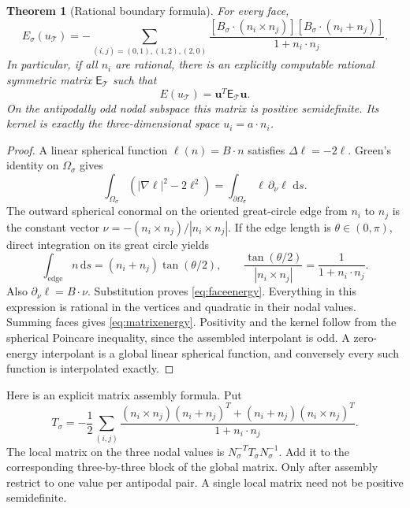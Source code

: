 \documentclass[11pt]{article}
\newtheorem{theorem}{Theorem}[section]
\theoremstyle{remark}\newtheorem{remark}[theorem]{Remark}
\newcommand{\dd}{\,\mathrm d}
\numberwithin{equation}{section}
\begin{document}
\begin{theorem}[Rational boundary formula]\label{thm:rationalmatrix}
For every face,
\begin{equation}\label{eq:faceenergy}
 \boxed{E_\sigma(u_{\mathcal T})
 =-\sum_{(i,j)=(0,1),(1,2),(2,0)}
 \frac{[B_\sigma\cdot(n_i\times n_j)]
       [B_\sigma\cdot(n_i+n_j)]}{1+n_i\cdot n_j}.}
\end{equation}
In particular, if all $n_i$ are rational, there is an explicitly computable
rational symmetric matrix $\mathsf E_{\mathcal T}$ such that
\begin{equation}\label{eq:matrixenergy}
 E(u_{\mathcal T})=\mathbf u^T\mathsf E_{\mathcal T}\mathbf u.
\end{equation}
On the antipodally odd nodal subspace this matrix is positive semidefinite.
Its kernel is exactly the three-dimensional space $u_i=a\cdot n_i$.
\end{theorem}
\begin{proof}
A linear spherical function $\ell(n)=B\cdot n$ satisfies $\Delta\ell=-2\ell$.
Green's identity on $\Omega_\sigma$ gives
\[
 \int_{\Omega_\sigma}(|\nabla\ell|^2-2\ell^2)
 =\int_{\partial\Omega_\sigma}\ell\,\partial_\nu\ell\,\dd s.
\]
The outward spherical conormal on the oriented great-circle edge from
$n_i$ to $n_j$ is the constant vector
$\nu=-(n_i\times n_j)/|n_i\times n_j|$.
If the edge length is $\theta\in(0,\pi)$, direct integration on its great
circle yields
\[
 \int_{\text{edge}}n\dd s=(n_i+n_j)\tan(\theta/2),\qquad
 \frac{\tan(\theta/2)}{|n_i\times n_j|}
 =\frac1{1+n_i\cdot n_j}.
\]
Also $\partial_\nu\ell=B\cdot\nu$. Substitution proves
\cref{eq:faceenergy}. Everything in this expression is rational in the
vertices and quadratic in their nodal values. Summing faces gives
\cref{eq:matrixenergy}. Positivity and the kernel follow from the spherical
Poincare inequality, since the assembled interpolant is odd. A zero-energy
interpolant is a global linear spherical function, and conversely every
such function is interpolated exactly.
\end{proof}

Here is an explicit matrix assembly formula. Put
\[
 T_\sigma=-\frac12\sum_{(i,j)}
 \frac{(n_i\times n_j)(n_i+n_j)^T+(n_i+n_j)(n_i\times n_j)^T}
 {1+n_i\cdot n_j}.
\]
The local matrix on the three nodal values is
$N_\sigma^{-T}T_\sigma N_\sigma^{-1}$.
Add it to the corresponding three-by-three block of the global matrix.
Only after assembly restrict to one value per antipodal pair.
A single local matrix need not be positive semidefinite.
\end{document}
